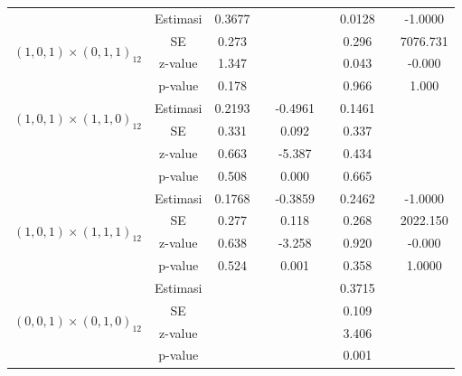 \begin{enumerate}[label=\alph*.]
\begin{longtable}{|c|c|c|c|c|c|c|c|c|}
            \multirow{4}{*}{$(1,0,1)\times(0,1,1)_{12}$}
            & Estimasi & 0.3677  & {} & {} & {} & 0.0128 & {} & -1.0000\\ \cline{2-9}
            & SE       & 0.273 & {} & {} & {} & 0.296 & {} & 7076.731\\ \cline{2-9}
            & z-value  & 1.347  & {} & {} & {} & 0.043 & {}& -0.000\\ \cline{2-9}
            & p-value  & 0.178 & {} & {} & {} & 0.966 & {} & 1.000\\ \hline

            \multirow{2}{*}{$(1,0,1)\times(1,1,0)_{12}$}
            & Estimasi & 0.2193  & {} & -0.4961 & {} & 0.1461 & {} & {}\\ \cline{2-9}
            & SE       & 0.331 & {} & 0.092 & {} & 0.337 & {} & {}\\ \cline{2-9}
            & z-value  & 0.663  & {} & -5.387 & {} & 0.434 & {}& {}\\ \cline{2-9}
            & p-value  & 0.508 & {} & 0.000 & {} & 0.665 & {} & {}\\ \hline

            \multirow{4}{*}{$(1,0,1)\times(1,1,1)_{12}$}
            & Estimasi & 0.1768  & {} & -0.3859 & {} & 0.2462 & {} & -1.0000\\ \cline{2-9}
            & SE       & 0.277 & {} & 0.118 & {} & 0.268 & {} & 2022.150\\ \cline{2-9}
            & z-value  & 0.638  & {} & -3.258 & {} & 0.920 & {}& -0.000\\ \cline{2-9}
            & p-value  & 0.524 & {} & 0.001 & {} & 0.358 & {} & 1.0000\\ \hline

            \multirow{4}{*}{$(0,0,1)\times(0,1,0)_{12}$}
            & Estimasi & {} & {} & {} & {} & 0.3715 & {} & {}\\ \cline{2-9}
            & SE       & {} & {} & {} & {} & 0.109 & {} & {}\\ \cline{2-9}
            & z-value  & {} & {} & {} & {} & 3.406 & {}& {}\\ \cline{2-9}
            & p-value  & {} & {} & {} & {} & 0.001 & {} & {}\\ \hline


\end{longtable}
\end{enumerate}
